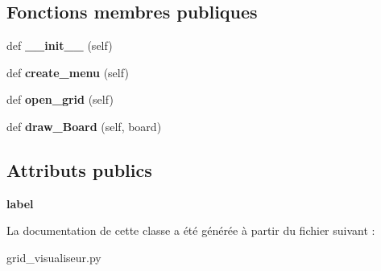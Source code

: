 \subsection*{Fonctions membres publiques}
\begin{DoxyCompactItemize}
\item 
\mbox{\label{classgrid__visualiseur_1_1MainWindow_aa58b1a902fbbe5e3ceda337c7ef87658}} 
def {\bfseries \+\_\+\+\_\+init\+\_\+\+\_\+} (self)
\item 
\mbox{\label{classgrid__visualiseur_1_1MainWindow_a4c84e902c352f90578745c1d5112e373}} 
def {\bfseries create\+\_\+menu} (self)
\item 
\mbox{\label{classgrid__visualiseur_1_1MainWindow_a6d4f89a1640755a326a358026815ca66}} 
def {\bfseries open\+\_\+grid} (self)
\item 
\mbox{\label{classgrid__visualiseur_1_1MainWindow_a4915c6cc9059cb6949bc8d1e997e1af1}} 
def {\bfseries draw\+\_\+\+Board} (self, board)
\end{DoxyCompactItemize}
\subsection*{Attributs publics}
\begin{DoxyCompactItemize}
\item 
\mbox{\label{classgrid__visualiseur_1_1MainWindow_a1f610c2428199203787c063b39ce3c3e}} 
{\bfseries label}
\end{DoxyCompactItemize}


La documentation de cette classe a été générée à partir du fichier suivant \+:\begin{DoxyCompactItemize}
\item 
grid\+\_\+visualiseur.\+py\end{DoxyCompactItemize}
